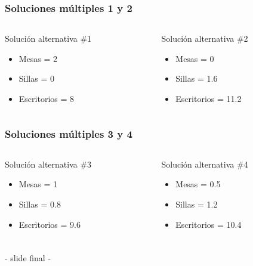 \documentclass{beamer}
\begin{document}
\begin{frame}[shrink]   
\frametitle{Soluciones múltiples 1 y 2} 
\begin{columns} 
\begin{column}{0.5\textwidth} 
\begin{exampleblock}{Solución alternativa \#1} 
\begin{itemize} 
\item Mesas = 2 
\item Sillas = 0 
\item Escritorios = 8 
\end{itemize}  
\end{exampleblock}  
\end{column} 
\begin{column}{0.5\textwidth} 
\begin{exampleblock}{Solución alternativa \#2} 
\begin{itemize}  
\item Mesas = 0 
\item Sillas = 1.6 
\item Escritorios = 11.2 
\end{itemize}  
\end{exampleblock}  
\end{column} 
\end{columns} 
\end{frame} 


\begin{frame}[shrink]   
\frametitle{Soluciones múltiples 3 y 4} 
\begin{columns} 
\begin{column}{0.5\textwidth} 
\begin{exampleblock}{Solución alternativa \#3} 
\begin{itemize} 
\item Mesas = 1 
\item Sillas = 0.8 
\item Escritorios = 9.6 
\end{itemize}  
\end{exampleblock}  
\end{column} 
\begin{column}{0.5\textwidth} 
\begin{exampleblock}{Solución alternativa \#4} 
\begin{itemize}  
\item Mesas = 0.5 
\item Sillas = 1.2 
\item Escritorios = 10.4 
\end{itemize}  
\end{exampleblock}  
\end{column} 
\end{columns} 
\end{frame} 

\begin{frame}\frametitle{}\begin{center}{\Huge - slide final -}\end{center}\end{frame} 
\end{document}

